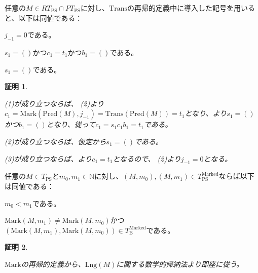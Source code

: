 \documentclass[dvipdfmx,uplatex]{jsarticle}
\theoremstyle{customnonumberbreakfortheorem}
\theoremstyle{customnonumberbreakforproof}
\newtheorem{hideableproof}{証明}
\begin{document}
\begin{corollary}[\(s_1\)と\(b_1\)の空性と基点の関係]\label{s_1とb_1の空性と基点の関係}
	任意の\(M \in RT_{\textrm{PS}} \cap PT_{\textrm{PS}}\)に対し、\(\textrm{Trans}\)の再帰的定義中に導入した記号を用いると、以下は同値である：
	\begin{penumerate}
		\item \(j_{-1} = 0\)である。
		\item \(s_1 = ()\)かつ\(c_1 = t_1\)かつ\(b_1 = ()\)である。
		\item \(s_1 = ()\)である。
	\end{penumerate}
\end{corollary}

\begin{hideableproof}
	\begin{indented}
		\item (1)が成り立つならば、 (2)より\(c_1 = \textrm{Mark}(\textrm{Pred}(M),j_{-1}) = \textrm{Trans}(\textrm{Pred}(M)) = t_1\)となり、より\(s_1 = ()\)かつ\(b_1 = ()\)となり、従って\(c_1 = s_1 c_1 b_1 = t_1\)である。
		\item (2)が成り立つならば、仮定から\(s_1 = ()\)である。
		\item (3)が成り立つならば、より\(c_1 = t_1\)となるので、 (2)より\(j_{-1} = 0\)となる。
	\end{indented}
\end{hideableproof}

\begin{proposition}\label{Markが順序関係を保つこと}
	任意の\(M \in T_{\textrm{PS}}\)と\(m_0,m_1 \in \mathbb{N}\)に対し、\((M,m_0), (M,m_1) \in T_{\textrm{PS}}^{\textrm{Marked}}\)ならば以下は同値である：
	\begin{penumerate}
		\item \(m_0 < m_1\)である。
		\item \(\textrm{Mark}(M,m_1) \neq \textrm{Mark}(M,m_0)\)かつ\((\textrm{Mark}(M,m_1),\textrm{Mark}(M,m_0)) \in T_{\textrm{B}}^{\textrm{Marked}}\)である。
	\end{penumerate}
\end{proposition}

\begin{hideableproof}
	\begin{indented}
		\item \(\textrm{Mark}\)の再帰的定義から、\(\textrm{Lng}(M)\)に関する数学的帰納法より即座に従う。
	\end{indented}
\end{hideableproof}
\end{document}
